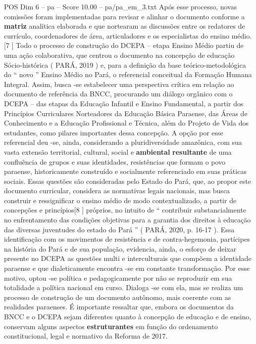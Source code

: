 \begin{textsample}{POS Dim 6 – pa – Score 10.00 – pa/pa\_em\_3.txt}
Após esse processo, novas comissões foram implementadas para revisar e alinhar o documento conforme a \textbf{matriz} analítica elaborada e que nortearam as discussões entre os redatores de currículo, coordenadores de área, articuladores e os especialistas do ensino médio.[7 ] Todo o processo de construção do DCEPA – etapa Ensino Médio partiu de uma ação colaborativa, que centrou o documento na concepção de educação Sócio-histórica ( PARÁ, 2019 ) e, para a definição da base teórico-metodológica do “ novo ” Ensino Médio no Pará, o referencial conceitual da Formação Humana Integral.
Assim, busca -se estabelecer uma perspectiva crítica em relação ao documento de referência da BNCC, procurando um diálogo orgânico com o DCEPA – das etapas da Educação Infantil e Ensino Fundamental, a partir dos Princípios Curriculares Norteadores da Educação Básica Paraense, das Áreas de Conhecimento e a Educação Profissional e Técnica, além do Projeto de Vida dos estudantes, como pilares importantes dessa concepção.
A opção por esse referencial deu -se, ainda, considerando a pluridiversidade amazônica, com sua vasta extensão territorial, cultural, social e \textbf{ambiental} \textbf{resultante} de uma confluência de grupos e suas identidades, resistências que formam o povo paraense, historicamente construído e socialmente referenciado em suas práticas sociais.
Essas questões são consideradas pelo Estado do Pará, que, ao propor este documento curricular, considera as normativas legais nacionais, mas busca construir e ressignificar o ensino médio de modo contextualizado, a partir de concepções e princípios[8 ] próprios, no intuito de “ contribuir substancialmente no enfrentamento das condições objetivas para a garantia dos direitos à educação das diversas juventudes do estado do Pará ” ( PARÁ, 2020, p. 16-17 ).
Essa identificação com os movimentos de resistência e de contra-hegemonia, partícipes na história do Pará e de sua população, evidencia, ainda, o esforço de deixar presente no DCEPA as questões multi e interculturais que compõem a identidade paraense e que dialeticamente encontra -se em constante transformação.
Por esse motivo, optou -se política e pedagogicamente por não se reproduzir em sua totalidade a política nacional em curso.
Dialoga -se com ela, mas se realiza um processo de construção de um documento autônomo, mais coerente com as realidades paraenses.
É importante ressaltar que, embora os documentos da BNCC e o DCEPA sejam diferentes quanto à concepção de educação e de ensino, conservam alguns aspectos \textbf{estruturantes} em função do ordenamento constitucional, legal e normativo da Reforma de 2017.

\end{textsample}
